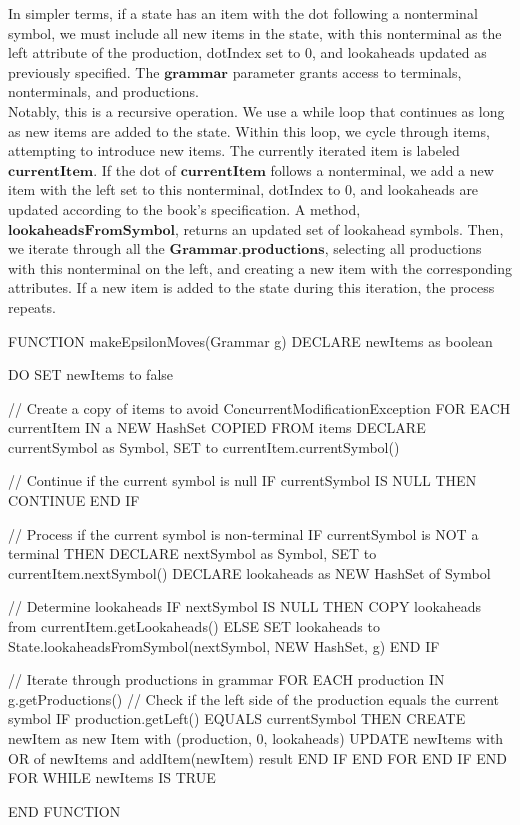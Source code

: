 In simpler terms, if a state has an item with the dot following a nonterminal symbol, we must include all new items in the state, with this nonterminal as the left attribute of the production, dotIndex set to 0, and lookaheads updated as previously specified. The \(\boldsymbol{grammar}\) parameter grants access to terminals, nonterminals, and productions.\\

Notably, this is a recursive operation. We use a while loop that continues as long as new items are added to the state. Within this loop, we cycle through items, attempting to introduce new items. The currently iterated item is labeled  \(\boldsymbol{currentItem}\). If the dot of \(\boldsymbol{currentItem}\) follows a nonterminal, we add a new item with the left set to this nonterminal, dotIndex to 0, and lookaheads are updated according to the book's specification. A method, \(\boldsymbol{lookaheadsFromSymbol}\), returns an updated set of lookahead symbols. Then, we iterate through all the \(\boldsymbol{Grammar.productions}\), selecting all productions with this nonterminal on the left, and creating a new item with the corresponding attributes. If a new item is added to the state during this iteration, the process repeats.\\

\begin{codeblock}
    FUNCTION makeEpsilonMoves(Grammar g)
    DECLARE newItems as boolean

    DO
    SET newItems to false

    // Create a copy of items to avoid ConcurrentModificationException
    FOR EACH currentItem IN a NEW HashSet COPIED FROM items
    DECLARE currentSymbol as Symbol, SET to currentItem.currentSymbol()

    // Continue if the current symbol is null
    IF currentSymbol IS NULL THEN
    CONTINUE
    END IF

    // Process if the current symbol is non-terminal
    IF currentSymbol is NOT a terminal THEN
    DECLARE nextSymbol as Symbol, SET to currentItem.nextSymbol()
    DECLARE lookaheads as NEW HashSet of Symbol

    // Determine lookaheads
    IF nextSymbol IS NULL THEN
    COPY lookaheads from currentItem.getLookaheads()
    ELSE
    SET lookaheads to State.lookaheadsFromSymbol(nextSymbol, NEW HashSet, g)
    END IF

    // Iterate through productions in grammar
    FOR EACH production IN g.getProductions()
    // Check if the left side of the production equals the current symbol
    IF production.getLeft() EQUALS currentSymbol THEN
    CREATE newItem as new Item with (production, 0, lookaheads)
    UPDATE newItems with OR of newItems and addItem(newItem) result
    END IF
    END FOR
    END IF
    END FOR
    WHILE newItems IS TRUE

    END FUNCTION
\end{codeblock}

